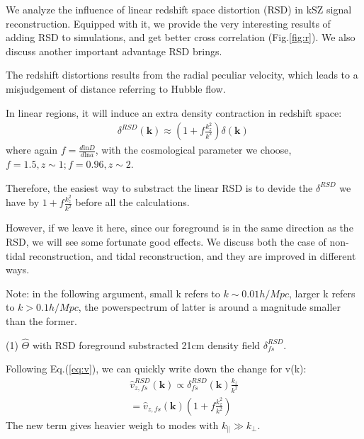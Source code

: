 We analyze the influence of linear redshift space distortion (RSD) in kSZ signal reconstruction. 
Equipped with it, we provide the very interesting results of adding RSD to simulations, 
and get better cross correlation (Fig.\ref{fig:r}). 
We also discuss another important advantage RSD brings.

The redshift distortions results from the radial peculiar velocity, 
which leads to a misjudgement of distance referring to Hubble flow.

In linear regions, it will induce an extra density contraction in redshift space:
\begin{eqnarray}
\label{eq:rsd}
\delta^{RSD}(\bm{k})\approx (1+f\frac{k_z^2}{k^2})\delta(\bm{k})\,
\end{eqnarray}
where again $f=\frac{d\mathrm{ln}D}{d\mathrm{ln}a}$, 
with the cosmological parameter we choose, $f=1.5, z\sim1; f=0.96, z\sim2$. 

Therefore, the easiest way to substract the linear RSD is to 
devide the $\delta^{RSD}$ we have by $1+f\frac{k_z^2}{k^2}$ 
before all the calculations.

However, if we leave it here, since our foreground is in the same direction as the RSD, we will see some fortunate good effects.
We discuss both the case of non-tidal reconstruction, 
and tidal reconstruction, and they are improved in different ways. 

Note: in the following argument, small k refers to $k\sim 0.01h/Mpc$, larger k refers to $k>0.1h/Mpc$, the powerspectrum of latter is around a magnitude smaller than the former.

(1) $\hat \Theta$ with RSD foreground substracted 21cm density field $\delta_{fs}^{RSD}$.

Following Eq.(\ref{eq:v}), we can quickly write down the change for v(k):
\begin{eqnarray}
    \hat v_{z,fs}^{RSD}(\bm{k})\propto \delta^{RSD}_{fs}(\bm{k})\frac{k_z}{k^2}\\
    =\hat v_{z,fs}(\bm{k})(1+f\frac{k_z^2}{k^2})
\end{eqnarray}
The new term gives heavier weigh to modes with $k_\parallel\gg k_\perp$.

